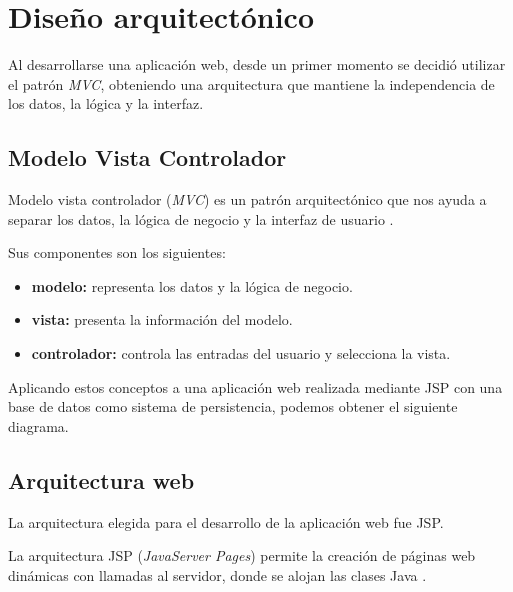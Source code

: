 \section{Diseño arquitectónico}

Al desarrollarse una aplicación web, desde un primer momento se decidió utilizar el patrón \emph{MVC}, obteniendo una arquitectura que mantiene la independencia de los datos, la lógica y la interfaz.

\subsection{Modelo Vista Controlador}

Modelo vista controlador (\emph{MVC}) es un patrón arquitectónico que nos ayuda a separar los datos, la lógica de negocio y la interfaz de usuario \cite{mvc:wiki}.


Sus componentes son los siguientes:

\begin{itemize}
\tightlist
\item
  \textbf{modelo:} representa los datos y la lógica de negocio.
\item
  \textbf{vista:} presenta la información del modelo.
\item
  \textbf{controlador:} controla las entradas del usuario y selecciona la vista.
\end{itemize}


Aplicando estos conceptos a una aplicación web realizada mediante JSP con una base de datos como sistema de persistencia, podemos obtener el siguiente diagrama.



\subsection{Arquitectura web}

La arquitectura elegida para el desarrollo de la aplicación web fue JSP.

La arquitectura JSP (\emph{JavaServer Pages}) permite la creación de páginas web dinámicas con llamadas al servidor, donde se alojan las clases Java \cite{jsp:wiki}.


